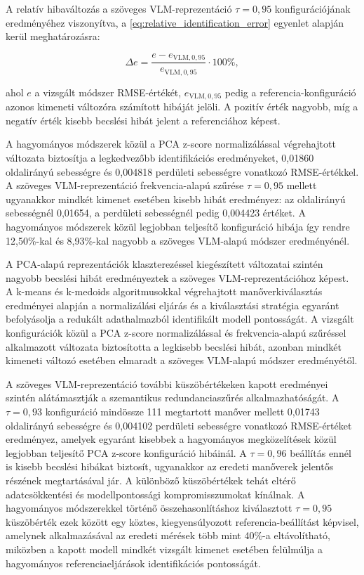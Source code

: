 \documentclass[12pt,a4paper,onehalfspacing, oneside]{book} %
\begin{document}
A relatív hibaváltozás a szöveges VLM-reprezentáció $\tau=0{,}95$ konfigurációjának eredményéhez viszonyítva, a \ref{eq:relative_identification_error} egyenlet alapján kerül meghatározásra:

\begin{equation}
    \Delta e = \frac{e-e_{\mathrm{VLM},0{,}95}}{e_{\mathrm{VLM},0{,}95}}\cdot100\%,
    \label{eq:relative_identification_error}
\end{equation}

ahol $e$ a vizsgált módszer RMSE-értékét, $e_{\mathrm{VLM},0{,}95}$ pedig a referencia-konfiguráció azonos kimeneti változóra számított hibáját jelöli. A pozitív érték nagyobb, míg a negatív érték kisebb becslési hibát jelent a referenciához képest.

A hagyományos módszerek közül a PCA z-score normalizálással végrehajtott változata biztosítja a legkedvezőbb identifikációs eredményeket, 0,01860 oldalirányú sebességre és 0,004818 perdületi sebességre vonatkozó RMSE-értékkel. A szöveges VLM-reprezentáció frekvencia-alapú szűrése $\tau=0{,}95$ mellett ugyanakkor mindkét kimenet esetében kisebb hibát eredményez: az oldalirányú sebességnél 0,01654, a perdületi sebességnél pedig 0,004423 értéket. A hagyományos módszerek közül legjobban teljesítő konfiguráció hibája így rendre 12,50\%-kal és 8,93\%-kal nagyobb a szöveges VLM-alapú módszer eredményénél.

A PCA-alapú reprezentációk klaszterezéssel kiegészített változatai szintén nagyobb becslési hibát eredményeztek a szöveges VLM-reprezentációhoz képest. A k-means és k-medoids algoritmusokkal végrehajtott manőverkiválasztás eredményei alapján a normalizálási eljárás és a kiválasztási stratégia egyaránt befolyásolja a redukált adathalmazból identifikált modell pontosságát. A vizsgált konfigurációk közül a PCA z-score normalizálással és frekvencia-alapú szűréssel alkalmazott változata biztosította a legkisebb becslési hibát, azonban mindkét kimeneti változó esetében elmaradt a szöveges VLM-alapú módszer eredményétől.

A szöveges VLM-reprezentáció további küszöbértékeken kapott eredményei szintén alátámasztják a szemantikus redundanciaszűrés alkalmazhatóságát. A $\tau=0{,}93$ konfiguráció mindössze 111 megtartott manőver mellett 0,01743 oldalirányú sebességre és 0,004102 perdületi sebességre vonatkozó RMSE-értéket eredményez, amelyek egyaránt kisebbek a hagyományos megközelítések közül legjobban teljesítő PCA z-score konfiguráció hibáinál. A $\tau=0{,}96$ beállítás ennél is kisebb becslési hibákat biztosít, ugyanakkor az eredeti manőverek jelentős részének megtartásával jár. A különböző küszöbértékek tehát eltérő adatcsökkentési és modellpontossági kompromisszumokat kínálnak. A hagyományos módszerekkel történő összehasonlításhoz kiválasztott $\tau=0{,}95$ küszöbérték ezek között egy köztes, kiegyensúlyozott referencia-beállítást képvisel, amelynek alkalmazásával az eredeti mérések több mint 40\%-a eltávolítható, miközben a kapott modell mindkét vizsgált kimenet esetében felülmúlja a hagyományos referenciaeljárások identifikációs pontosságát.
\end{document}
